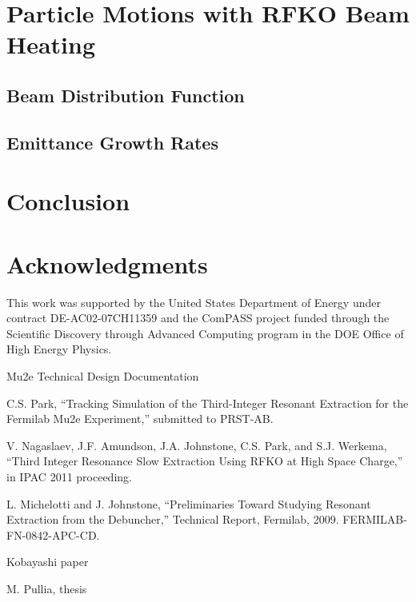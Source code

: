 \documentclass[aps,prstab,onecolumn,preprint,endfloats,11pt]{revtex4-1}
\begin{document}
\clearpage
\section{\label{sec:rfko}Particle Motions with RFKO Beam Heating}

\subsection{\label{sec:dist}Beam Distribution Function}

\subsection{\label{sec:emit}Emittance Growth Rates}

\section{\label{sec:conclusion}Conclusion}

\section{\label{thanks}Acknowledgments}

This work was supported by the United States Department of Energy under contract DE-AC02-07CH11359 and the ComPASS project funded through the Scientific Discovery through Advanced Computing program in the DOE Office of High Energy Physics.


\begin{thebibliography}{77}
  Mu2e Technical Design Documentation

  C.S. Park, ``Tracking Simulation of the Third-Integer Resonant Extraction for 
the Fermilab Mu2e Experiment,'' submitted to PRST-AB.

  V. Nagaslaev, J.F. Amundson, J.A. Johnstone, C.S. Park, and S.J. Werkema, 
``Third Integer Resonance Slow Extraction Using RFKO at High Space Charge,'' in 
IPAC 2011 proceeding.

  L. Michelotti and J. Johnstone, ``Preliminaries Toward Studying Resonant 
Extraction from
the Debuncher,'' Technical Report, Fermilab, 2009. FERMILAB-FN-0842-APC-CD.

  Kobayashi paper

  M. Pullia, thesis
\end{thebibliography}
\end{document}
